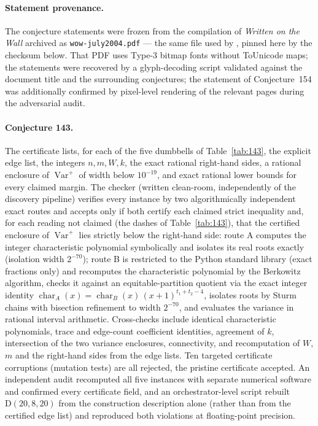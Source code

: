 \documentclass[11pt]{article}
\theoremstyle{remark}
\newcommand{\Varp}{\operatorname{Var}^{+}}
\newcommand{\D}{\mathrm{D}}
\begin{document}
\paragraph{Statement provenance.}
The conjecture statements were frozen from the compilation of
\emph{Written on the Wall} archived as \texttt{wow-july2004.pdf} \cite{WOW}
--- the same file used by \cite{RoucairolCazenave2025}, pinned here by the
checksum below. That PDF uses Type-3 bitmap fonts without
ToUnicode maps; the statements were recovered by a glyph-decoding script
validated against the document title and the surrounding conjectures; the
statement of Conjecture~154 was additionally confirmed by pixel-level
rendering of the relevant pages during the adversarial audit.

\paragraph{Conjecture 143.}
The certificate lists, for each of the five dumbbells of
Table~\ref{tab:143}, the explicit edge list, the integers $n, m, W, k$, the
exact rational right-hand sides, a rational enclosure of $\Varp$ of width
below $10^{-19}$, and exact rational lower bounds for every claimed margin.
The checker (written clean-room, independently of the discovery pipeline)
verifies every instance by two algorithmically independent exact routes and
accepts only if both certify each claimed strict inequality and, for each
reading not claimed (the dashes of Table~\ref{tab:143}), that the certified
enclosure of $\Varp$ lies strictly below the right-hand side: route A
computes the integer
characteristic polynomial symbolically and isolates its real roots exactly
(isolation width $2^{-70}$); route B is restricted to the Python standard
library (exact fractions only) and recomputes the characteristic polynomial
by the Berkowitz algorithm, checks it against an equitable-partition quotient
via the exact integer identity
$\operatorname{char}_A(x) = \operatorname{char}_B(x)\,(x+1)^{t_1+t_2-4}$,
isolates roots by Sturm chains with bisection refinement to width $2^{-70}$,
and evaluates the variance in rational interval arithmetic. Cross-checks
include identical characteristic polynomials, trace and edge-count
coefficient identities, agreement of $k$, intersection of the two variance
enclosures, connectivity, and recomputation of $W$, $m$ and the right-hand
sides from the edge lists. Ten targeted certificate corruptions (mutation
tests) are all rejected, the pristine certificate accepted. An independent
audit recomputed all five instances with separate numerical software and
confirmed every certificate field, and an orchestrator-level script rebuilt
$\D(20,8,20)$ from the construction description alone (rather than from the
certified edge list) and reproduced both violations at floating-point
precision.
\end{document}
